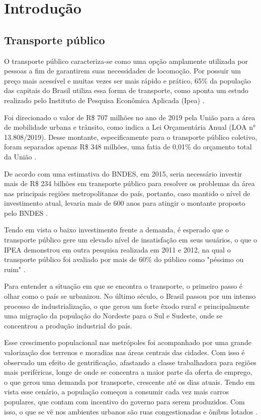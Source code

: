 \chapter{Introdução}
\label{Cap:Intro}


\section{Transporte público}
\indent
\par O transporte público caracteriza-se como uma opção amplamente utilizada por pessoas a fim de garantirem suas necessidades de locomoção. Por possuir um preço mais acessível e muitas vezes ser mais rápido e prático, 65\% da população das capitais do Brasil utiliza essa forma de transporte, como aponta um estudo realizado pelo Instituto de Pesquisa Econômica Aplicada (Ipea) \cite{Peduzzi2011}.
\par Foi direcionado o valor de R\$ 707 milhões no ano de 2019 pela União para a área de mobilidade urbana e trânsito, como indica a Lei Orçamentária Anual (LOA n° 13.808/2019). Desse montante, especificamente para o transporte público coletivo, foram separados apenas R\$ 348 milhões, uma fatia de 0,01\% do orçamento total da União \cite{NTUrbano}.
\par De acordo com uma estimativa do BNDES, em 2015, seria necessário investir mais de R\$ 234 bilhões em transporte público para resolver os problemas da área nas principais regiões metropolitanas do país, portanto, caso mantido o nível de investimento atual, levaria mais de 600 anos para atingir o montante proposto pelo BNDES \cite{Santos2015}.
\par Tendo em vista o baixo investimento frente a demanda, é esperado que o transporte público gere um elevado nível de insatisfação em seus usuários, o que o IPEA demonstrou em outra pesquisa realizada em 2011 e 2012, na qual o transporte público foi avaliado por mais de 60\% do público como "péssimo ou ruim"  \cite{Santos2015}.
\par Para entender a situação em que se encontra o transporte, o primeiro passo é olhar como o país se urbanizou. No último século, o Brasil passou por um intenso processo de industrialização, o que gerou um forte êxodo rural e principalmente uma migração da população do Nordeste para o Sul e Sudeste, onde se concentrou a produção industrial do país.
\par Esse crescimento populacional nas metrópoles foi acompanhado por uma grande valorização dos terrenos e moradias nas áreas centrais das cidades. Com isso é observado um efeito de gentrificação, afastando a classe trabalhadora para regiões mais periféricas, longe de onde se concentra a maior parte da oferta de emprego, o que gerou uma demanda por transporte, crescente até os dias atuais.
Tendo em vista esse cenário, a população começou a consumir cada vez mais carros populares, que contam com incentivo do governo para serem produzidos. Com isso, o que se vê nos ambientes urbanos são ruas congestionadas e ônibus lotados \cite{PenaSD}.


